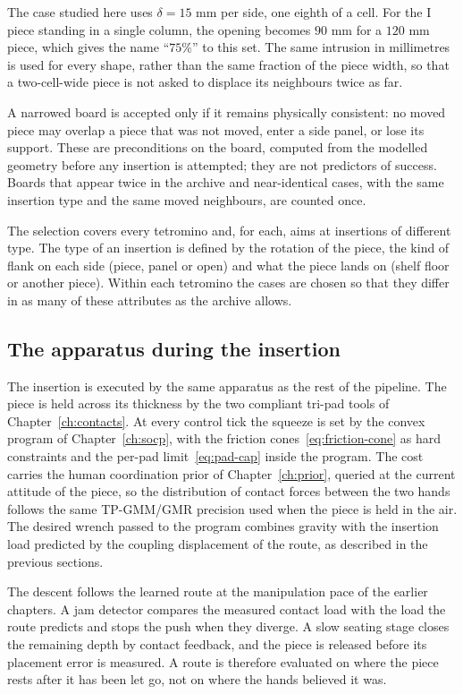 The case studied here uses $\delta=15$ mm per side, one eighth of a cell. For the I piece standing in a single column, the opening becomes $90$ mm for a $120$ mm piece, which gives the name ``$75\%$'' to this set. The same intrusion in millimetres is used for every shape, rather than the same fraction of the piece width, so that a two-cell-wide piece is not asked to displace its neighbours twice as far.

A narrowed board is accepted only if it remains physically consistent: no moved piece may overlap a piece that was not moved, enter a side panel, or lose its support. These are preconditions on the board, computed from the modelled geometry before any insertion is attempted; they are not predictors of success. Boards that appear twice in the archive and near-identical cases, with the same insertion type and the same moved neighbours, are counted once.

The selection covers every tetromino and, for each, aims at insertions of different type. The type of an insertion is defined by the rotation of the piece, the kind of flank on each side (piece, panel or open) and what the piece lands on (shelf floor or another piece). Within each tetromino the cases are chosen so that they differ in as many of these attributes as the archive allows.

\subsection{The apparatus during the insertion}

The insertion is executed by the same apparatus as the rest of the pipeline. The piece is held across its thickness by the two compliant tri-pad tools of Chapter~\ref{ch:contacts}. At every control tick the squeeze is set by the convex program of Chapter~\ref{ch:socp}, with the friction cones~\eqref{eq:friction-cone} as hard constraints and the per-pad limit~\eqref{eq:pad-cap} inside the program. The cost carries the human coordination prior of Chapter~\ref{ch:prior}, queried at the current attitude of the piece, so the distribution of contact forces between the two hands follows the same TP-GMM/GMR precision used when the piece is held in the air. The desired wrench passed to the program combines gravity with the insertion load predicted by the coupling displacement of the route, as described in the previous sections.

The descent follows the learned route at the manipulation pace of the earlier chapters. A jam detector compares the measured contact load with the load the route predicts and stops the push when they diverge. A slow seating stage closes the remaining depth by contact feedback, and the piece is released before its placement error is measured. A route is therefore evaluated on where the piece rests after it has been let go, not on where the hands believed it was.

